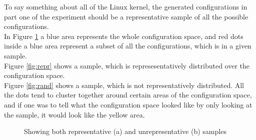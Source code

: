 \documentclass[a4paper,11pt]{report}
\newcommand{\figa}{
    \begin{figure}[!htpb]
    \centering
}
\newcommand{\figb}[2]{
    \caption{#1}
    \label{#2}
    \end{figure}
}
\begin{document}
To say something about all of the Linux kernel, the generated configurations 
in part one of the experiment  should be a representative sample of all the 
possible configurations. 
\\


In Figure \ref{fig:reprrand} a blue area represents the whole configuration 
space, and red dots inside a blue area represent a subset of all the 
configurations, which is in a given sample.
\\

Figure \ref{fig:repr} shows a sample, which is represesentatively distributed 
over the configuration space. 
\\

Figure \ref{fig:rand} shows a sample, which is not representatively 
distributed. All the dots tend to cluster together around certain areas of the 
configuration space, and if one was to tell what the configuration space looked 
like by only looking at the sample, it would look like the yellow area.

\figa
\figb{Showing both representative (a) and unrepresentative (b) samples}{fig:reprrand}
\end{document}
